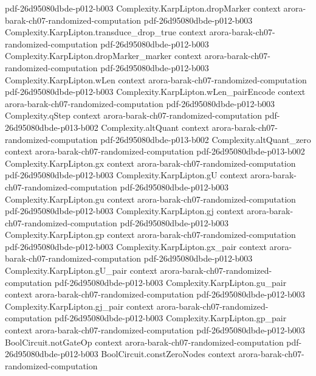\begin{theorem}
  {pdf-26d95080dbde-p012-b003}
\proofstep
  {Complexity.KarpLipton.dropMarker}
  {context}
  {arora-barak-ch07-randomized-computation}
  {pdf-26d95080dbde-p012-b003}
\proofstep
  {Complexity.KarpLipton.transduce_drop_true}
  {context}
  {arora-barak-ch07-randomized-computation}
  {pdf-26d95080dbde-p012-b003}
\proofstep
  {Complexity.KarpLipton.dropMarker_marker}
  {context}
  {arora-barak-ch07-randomized-computation}
  {pdf-26d95080dbde-p012-b003}
\proofstep
  {Complexity.KarpLipton.wLen}
  {context}
  {arora-barak-ch07-randomized-computation}
  {pdf-26d95080dbde-p012-b003}
\proofstep
  {Complexity.KarpLipton.wLen_pairEncode}
  {context}
  {arora-barak-ch07-randomized-computation}
  {pdf-26d95080dbde-p012-b003}
\proofstep
  {Complexity.qStep}
  {context}
  {arora-barak-ch07-randomized-computation}
  {pdf-26d95080dbde-p013-b002}
\proofstep
  {Complexity.altQuant}
  {context}
  {arora-barak-ch07-randomized-computation}
  {pdf-26d95080dbde-p013-b002}
\proofstep
  {Complexity.altQuant_zero}
  {context}
  {arora-barak-ch07-randomized-computation}
  {pdf-26d95080dbde-p013-b002}
\proofstep
  {Complexity.KarpLipton.gx}
  {context}
  {arora-barak-ch07-randomized-computation}
  {pdf-26d95080dbde-p012-b003}
\proofstep
  {Complexity.KarpLipton.gU}
  {context}
  {arora-barak-ch07-randomized-computation}
  {pdf-26d95080dbde-p012-b003}
\proofstep
  {Complexity.KarpLipton.gu}
  {context}
  {arora-barak-ch07-randomized-computation}
  {pdf-26d95080dbde-p012-b003}
\proofstep
  {Complexity.KarpLipton.gj}
  {context}
  {arora-barak-ch07-randomized-computation}
  {pdf-26d95080dbde-p012-b003}
\proofstep
  {Complexity.KarpLipton.gp}
  {context}
  {arora-barak-ch07-randomized-computation}
  {pdf-26d95080dbde-p012-b003}
\proofstep
  {Complexity.KarpLipton.gx_pair}
  {context}
  {arora-barak-ch07-randomized-computation}
  {pdf-26d95080dbde-p012-b003}
\proofstep
  {Complexity.KarpLipton.gU_pair}
  {context}
  {arora-barak-ch07-randomized-computation}
  {pdf-26d95080dbde-p012-b003}
\proofstep
  {Complexity.KarpLipton.gu_pair}
  {context}
  {arora-barak-ch07-randomized-computation}
  {pdf-26d95080dbde-p012-b003}
\proofstep
  {Complexity.KarpLipton.gj_pair}
  {context}
  {arora-barak-ch07-randomized-computation}
  {pdf-26d95080dbde-p012-b003}
\proofstep
  {Complexity.KarpLipton.gp_pair}
  {context}
  {arora-barak-ch07-randomized-computation}
  {pdf-26d95080dbde-p012-b003}
\proofstep
  {BoolCircuit.notGateOp}
  {context}
  {arora-barak-ch07-randomized-computation}
  {pdf-26d95080dbde-p012-b003}
\proofstep
  {BoolCircuit.constZeroNodes}
  {context}
  {arora-barak-ch07-randomized-computation}

\end{theorem}
